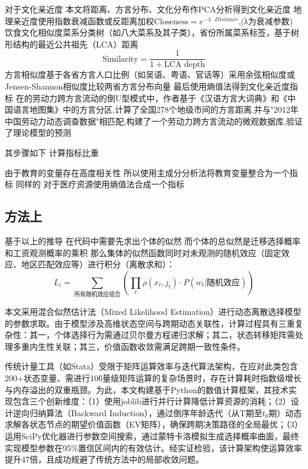 \documentclass[a4paper,12pt]{article}
\begin{document}
对于文化亲近度
本文将距离、方言分布、文化分布作PCA分析得到文化亲近度
地理亲近度使用指数衰减函数或反距离加权$\text{Closeness}=e^ {-\lambda \cdot Distance}$,(λ为衰减参数)
饮食文化相似度菜系分类树（如八大菜系及其子类），省份所属菜系标签，基于树形结构的最近公共祖先（LCA）距离
\begin{equation}
  \text{Similarity}=\frac{1}{1+\text{LCA depth}}
\end{equation}
方言相似度基于各省方言人口比例（如吴语、粤语、官话等）采用余弦相似度或Jensen-Shannon相似度比较两省方言分布向量
最后使用熵值法得到文化亲近度指标
在\cite{LiuYuYunLaoDongLiKuaFangYanLiuDongDeDaoUXingMoShi2015}的劳动力跨方言流动的倒U型模式中，作者基于《汉语方言大词典》和《中国语言地图集》中的方言分区,计算了全国278个地级市间的方言距离,并与"2012年中国劳动力动态调查数据"相匹配,构建了一个劳动力跨方言流动的微观数据库,验证了理论模型的预测


其步骤如下
计算指标比重


由于教育的变量存在高度相关性
所以使用主成分分析法将教育变量整合为一个指标
同样的
对于医疗资源使用熵值法合成一个指标

\subsection{方法上} %
\label{sub:方法上}
基于以上的推导
在代码中需要先求出个体的似然
而个体的总似然是迁移选择概率和工资观测概率的乘积
那么集体的似然函数同时对未观测的随机效应（固定效应、地区匹配效应等）进行积分（离散求和）：
\begin{equation}
  L_{i}=\sum\limits_{\text{所有随机效应组合}}(\prod_{t}\rho(x_{t},j_{t})⋅P(w_{t}|\text{随机效应}))
\end{equation}

本文采用混合似然估计法（Mixed Likelihood Estimation）进行动态离散选择模型的参数求取。由于模型涉及高维状态空间与跨期动态关联性，计算过程具有三重复杂性：其一，个体选择行为需通过贝尔曼方程递归求解；其二，状态转移矩阵需处理多重内生性关联；其三，价值函数收敛需满足跨期一致性条件。

传统计量工具（如Stata）受限于矩阵运算效率与迭代算法架构，在应对此类包含200+状态变量、需进行10\^6量级矩阵运算的复杂场景时，存在计算耗时指数级增长与内存溢出的双重瓶颈。为此，本文构建基于Python的数值计算框架，其技术实现包含三个创新维度：（1）使用joblib进行并行计算降低计算资源的消耗；（2）设计逆向归纳算法（Backward Induction），通过倒序年龄迭代（从T期至$t_0$期）动态求解各状态节点的期望价值函数（EV矩阵），确保跨期决策路径的全局最优；（3）运用SciPy优化器进行参数空间搜索，通过蒙特卡洛模拟生成选择概率曲面，最终实现模型参数在95\%置信区间内的有效估计。经实证检验，该计算架构使运算效率提升47倍，且成功规避了传统方法中的局部收敛问题。
\end{document}
